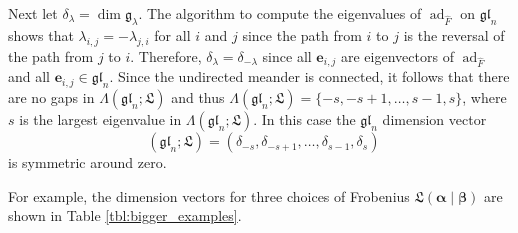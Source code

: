 \documentclass{amsart}
\def\be{\mathbf{e}}
\def\gl{\mathfrak{gl}}
\def\L{\mathfrak L}
\def\valpha{\boldsymbol{\alpha}}
\def\vbeta{\boldsymbol{\beta}}
\def\Ooms{\Lambda} %
\def\hatF{\widehat{F}}
\def\gln{\gl_n}
\def\dimvec{\mathop{\underline{\mathrm{dim}}}}
\def\ad{\operatorname{ad}}
\theoremstyle{definition}
\begin{document}
Next let $\delta_{\lambda}= \dim \mathfrak{g}_{\lambda}$. The algorithm to compute the eigenvalues of $\ad_{\hatF}$ on $\gln$ shows that $\lambda_{i,j}=-\lambda_{j,i}$ for all $i$ and $j$ since the path from $i$ to $j$ is the reversal of the path from $j$ to $i$. Therefore, $\delta_{\lambda}= \delta_{-\lambda}$ since all $\be_{i,j}$ are eigenvectors of $\ad_{\hatF}$ and all $\be_{i,j}\in \gln$.  Since the undirected meander is connected,  it follows that  there  are no gaps in $\Ooms(\gln;\L)$ and thus $\Ooms(\gln;\L)=\{-s, -s+1, \ldots, s-1,s\}$, where $s$ is the largest eigenvalue in $\Ooms(\gln;\L)$. In this case the $\gln$ dimension vector 
\[ \dimvec(\gln;\L)=(\delta_{-s}, \delta_{-s+1}, \ldots , \delta_{s-1}, \delta_s)\]
is symmetric around zero. 

For example, the dimension vectors for three choices of Frobenius $\L(\valpha \mid \vbeta)$ are shown in Table \ref{tbl:bigger_examples}.
\end{document}
